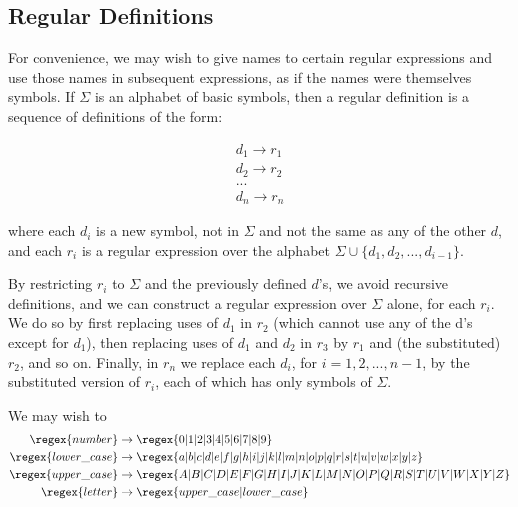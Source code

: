 
\subsection{Regular Definitions}

For convenience, we may wish to give names to certain regular expressions and use those names in subsequent expressions, as if the names were themselves symbols. If \(\Sigma\) is an alphabet of basic symbols, then a regular definition is a sequence of definitions of the form:

\begin{equation}
\begin{gathered} %
d_1 \to r_1\\
d_2 \to r_2\\
...\\
d_n \to r_n
\end{gathered}
\end{equation}

\noindent
where each \(d_i\) is a new symbol, not in \(\Sigma\) and not the same as any of the other \(d\), and each \(r_i\) is a regular expression over the alphabet \(\Sigma \cup \{ d_1, d_2, ..., d_{i-1} \}\).

By restricting \(r_i\) to \(\Sigma\) and the previously defined \(d\)'s, we avoid recursive definitions, and we can construct a regular expression over \(\Sigma\) alone, for each \(r_i\).
We do so by first replacing uses of \(d_1\) in \(r_2\) (which cannot use any of the d's except
for \(d_1\)), then replacing uses of \(d_1\) and \(d_2\) in \(r_3\) by \(r_1\) and (the substituted) \(r_2\), and so on. Finally, in \(r_n\) we replace each \(d_i\), for \(i = 1, 2, ..., n-1\), by the substituted version of \(r_i\), each of which has only symbols of \(\Sigma\).

\begin{example}

We may wish to
\begin{equation*}
\begin{aligned}
\regex{number} &\to \regex{0|1|2|3|4|5|6|7|8|9} \\
%
\regex{lower\_case} &\to \regex{a|b|c|d|e|f|g|h|i|j|k|l|m|n|o|p|q|r|s|t|u|v|w|x|y|z} \\
%
\regex{upper\_case} &\to \regex{A|B|C|D|E|F|G|H|I|J|K|L|M|N|O|P|Q|R|S|T|U|V|W|X|Y|Z}\\
%
\regex{letter} &\to \regex{upper\_case | lower\_case}
\end{aligned}
\end{equation*}
\end{example}




